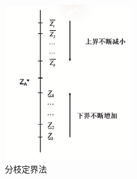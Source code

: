     \begin{figure}[H]
        \centering
        \includegraphics[width=0.5\textwidth]{./image/9.png}
        \caption{分枝定界法}
        \label{fig:Chapter4_Temporary_Pavilion_2}
    \end{figure}
